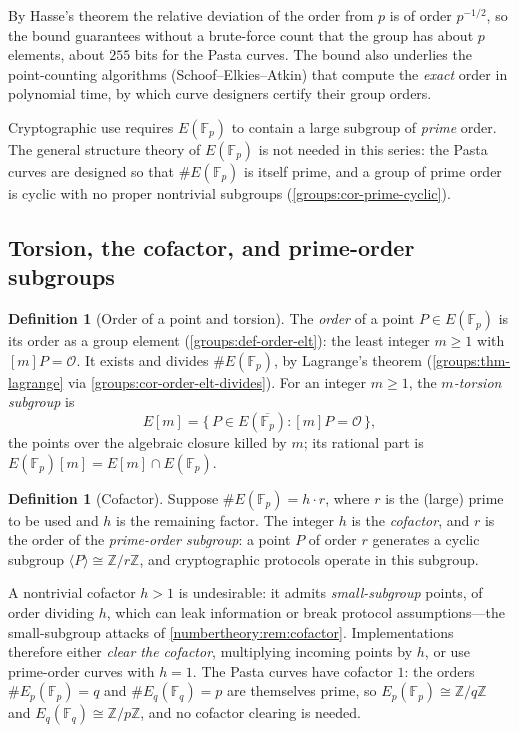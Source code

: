\documentclass[11pt,a4paper]{article}
\theoremstyle{definition}
\newtheorem{definition}[theorem]{Definition}
\theoremstyle{remark}
\newcommand{\Z}{\ensuremath{\mathbb{Z}}}
\newcommand{\Fp}{\ensuremath{\mathbb{F}_{p}}}
\newcommand{\Fq}{\ensuremath{\mathbb{F}_{q}}}
\begin{document}
By Hasse's theorem the relative deviation of the order from \(p\) is of
order \(p^{-1/2}\), so the bound guarantees without a brute-force count
that the group has about \(p\) elements, about \(255\) bits for the Pasta
curves. The bound also underlies the point-counting algorithms
(Schoof--Elkies--Atkin) that compute the \emph{exact} order in polynomial
time, by which curve designers certify their group orders.

Cryptographic use requires \(E(\Fp)\) to contain a large subgroup of
\emph{prime} order. The general structure theory of \(E(\Fp)\) is not
needed in this series: the Pasta curves are designed so that
\(\#E(\Fp)\) is itself prime, and a group of prime order is cyclic with no
proper nontrivial subgroups (\cref{groups:cor-prime-cyclic}).

\subsection{Torsion, the cofactor, and prime-order subgroups}
\label{ellipticcurves:subsec-torsion}

\begin{definition}[Order of a point and torsion]
\label{ellipticcurves:def-torsion}
The \emph{order} of a point \(P \in E(\Fp)\) is its order as a group
element (\cref{groups:def-order-elt}): the least integer \(m \geq 1\)
with \([m]P = \mathcal{O}\). It exists and divides \(\#E(\Fp)\), by
Lagrange's theorem (\cref{groups:thm-lagrange} via
\cref{groups:cor-order-elt-divides}). For an integer \(m \geq 1\), the
\emph{\(m\)-torsion subgroup} is
\[
  E[m] = \{\, P \in E(\overline{\Fp}) : [m]P = \mathcal{O} \,\},
\]
the points over the algebraic closure killed by \(m\); its rational
part is \(E(\Fp)[m] = E[m] \cap E(\Fp)\).
\end{definition}

\begin{definition}[Cofactor]\label{ellipticcurves:def-cofactor}
Suppose \(\#E(\Fp) = h \cdot r\), where \(r\) is the (large) prime to
be used and \(h\) is the remaining factor. The integer \(h\) is the
\emph{cofactor}, and \(r\) is the order of the \emph{prime-order
subgroup}: a point \(P\) of order \(r\) generates a cyclic subgroup
\(\langle P \rangle \cong \Z/r\Z\), and cryptographic protocols operate
in this subgroup.
\end{definition}

A nontrivial cofactor \(h > 1\) is undesirable: it admits
\emph{small-subgroup} points, of order dividing \(h\), which can leak
information or break protocol assumptions---the small-subgroup attacks
of \cref{numbertheory:rem:cofactor}. Implementations therefore either
\emph{clear the cofactor}, multiplying incoming points by \(h\), or use
prime-order curves with \(h = 1\). The Pasta curves have cofactor
\(1\): the orders \(\#E_p(\Fp) = q\) and \(\#E_q(\Fq) = p\) are
themselves prime, so \(E_p(\Fp) \cong \Z/q\Z\) and
\(E_q(\Fq) \cong \Z/p\Z\), and no cofactor clearing is needed.
\end{document}

